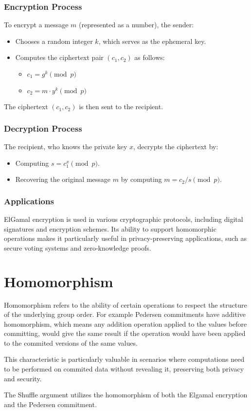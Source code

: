 \documentclass[12pt,a4paper]{report}
\begin{document}
\subsubsection*{Encryption Process}
To encrypt a message $m$ (represented as a number), the sender:
\begin{itemize}
	\item Chooses a random integer $k$, which serves as the ephemeral key.
	\item Computes the ciphertext pair $(c_1, c_2)$ as follows:
		\begin{itemize}
			\item $c_1 = g^k \pmod p$
			\item $c_2 = m \cdot y^k \pmod p$
		\end{itemize}
\end{itemize}
The ciphertext $(c_1, c_2)$ is then sent to the recipient.
\subsubsection{Decryption Process}
The recipient, who knows the private key $x$, decrypts the ciphertext by:
\begin{itemize}
	\item Computing $s = c_{1}^{x} \pmod p$.
	\item Recovering the original message $m$ by computing $m = c_2 / s \pmod p$.
\end{itemize}
\subsubsection{Applications}
ElGamal encryption is used in various cryptographic protocols, including digital signatures and encryption schemes. 
Its ability to support homomorphic operations makes it particularly useful in privacy-preserving applications, 
such as secure voting systems and zero-knowledge proofs.
\section{Homomorphism}
Homomorphism refers to the ability of certain operations to respect the structure of the underlying group order. 
For example Pedersen commitments have additive homomorphism, which means any addition operation applied to the values before committing, would give the same result if the operation would have been applied to the commited versions of the same values.\par   
This characteristic is particularly valuable in scenarios where computations need to be performed on commited data without revealing it, preserving both privacy and security.\par
The Shuffle argument utilizes the homomorphism of both the Elgamal encryption and the Pedersen commitment.
\end{document}
